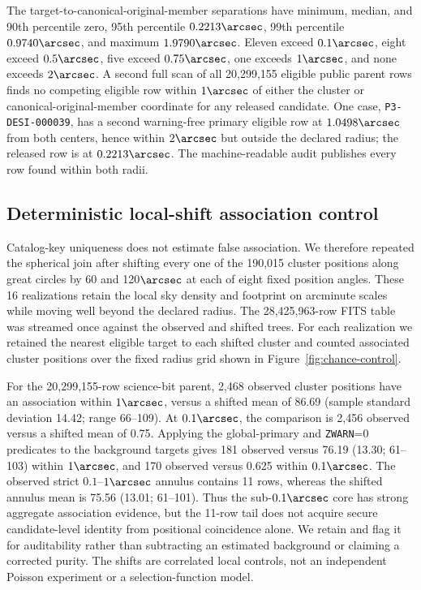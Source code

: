 \documentclass[twocolumn]{aastex701}
\begin{document}
The target-to-canonical-original-member separations have minimum, median, and 90th percentile
zero, 95th percentile $0.2213\arcsec$, 99th percentile $0.9740\arcsec$, and maximum
$1.9790\arcsec$.  Eleven exceed $0.1\arcsec$, eight exceed $0.5\arcsec$, five exceed
$0.75\arcsec$, one exceeds $1\arcsec$, and none exceeds $2\arcsec$.  A second full scan of all
20,299,155 eligible public parent rows finds no competing eligible row within $1\arcsec$ of either
the cluster or canonical-original-member coordinate for any released candidate.  One case,
\texttt{P3-DESI-000039}, has a second warning-free primary eligible row at $1.0498\arcsec$ from
both centers, hence within $2\arcsec$ but outside the declared radius; the released row is at
$0.2213\arcsec$.  The machine-readable audit publishes every row found within both radii.

\subsection{Deterministic local-shift association control}\label{sec:chance-control}

Catalog-key uniqueness does not estimate false association.  We therefore repeated the spherical
join after shifting every one of the 190,015 cluster positions along great circles by 60 and
120$\arcsec$ at each of eight fixed position angles.  These 16 realizations retain the local sky
density and footprint on arcminute scales while moving well beyond the declared radius.  The
28,425,963-row FITS table was streamed once against the observed and shifted trees.  For each
realization we retained the nearest eligible target to each shifted cluster and counted associated
cluster positions over the fixed radius grid shown in Figure~\ref{fig:chance-control}.

For the 20,299,155-row science-bit parent, 2,468 observed cluster positions have an association
within $1\arcsec$, versus a shifted mean of 86.69 (sample standard deviation 14.42; range 66--109).
At $0.1\arcsec$, the comparison is 2,456 observed versus a shifted mean of 0.75.  Applying the
global-primary and \texttt{ZWARN}=0 predicates to the background targets gives 181 observed versus
76.19 (13.30; 61--103) within $1\arcsec$, and 170 observed versus 0.625 within $0.1\arcsec$.
The observed strict $0.1$--$1\arcsec$ annulus contains 11 rows, whereas the shifted annulus mean
is 75.56 (13.01; 61--101).  Thus the sub-$0.1\arcsec$ core has strong aggregate association
evidence, but the 11-row tail does not acquire secure candidate-level identity from positional
coincidence alone.  We retain and flag it for auditability rather than subtracting an estimated
background or claiming a corrected purity.  The shifts are correlated local controls, not an
independent Poisson experiment or a selection-function model.
\end{document}
